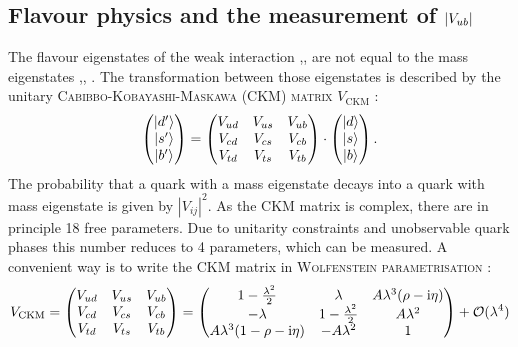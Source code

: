 \subsection{Flavour physics and the measurement of $|{V_{{u}{b}}}|$}
The flavour eigenstates of the weak interaction ,,  are not equal to the mass eigenstates \ket{\dquark},\ket{\squark},  \ket{\bquark}.
The transformation between those eigenstates is described by the unitary \textsc{Cabibbo-Kobayashi-Maskawa (CKM) matrix} $V_\text{CKM}$ \cite{Kobayashi_CKM}:
\begin{align}
\begin{pmatrix}
|d'\rangle \\ |s'\rangle \\ |b'\rangle
\end{pmatrix}
=
\begin{pmatrix}
V_{ud} & V_{us} & V_{ub} \\
V_{cd} & V_{cs} & V_{cb} \\
V_{td} & V_{ts} & V_{tb} \\
\end{pmatrix}
\cdot
\begin{pmatrix}
|d\rangle \\ |s\rangle \\ |b\rangle
\end{pmatrix}.
\end{align}
The probability that a quark with a mass eigenstate  decays into a quark with mass eigenstate  is given by $|V_{ij}|^2$.
As the CKM matrix is complex, there are in principle 18 free parameters.
Due to unitarity constraints and unobservable quark phases this number reduces to 4 parameters, which can be measured.
A convenient way is to write the CKM matrix in \textsc{Wolfenstein parametrisation} \cite{Wolfenstein}:
\begin{align}
    V_{\text{CKM}}=
    \begin{pmatrix}
    V_{ud} & V_{us} & V_{ub} \\
    V_{cd} & V_{cs} & V_{cb} \\
    V_{td} & V_{ts} & V_{tb} \\
    \end{pmatrix}
    =
    \begin{pmatrix}
    1-\frac{\lambda^2}{2} & \lambda & A\lambda^3(\rho-\mathrm{i}\eta) \\
    -\lambda & 1-\frac{\lambda^2}{2} & A\lambda^2 \\
    A\lambda^3(1-\rho-\mathrm{i}\eta) & -A\lambda^2 & 1
    \end{pmatrix}
    + \mathcal{O}(\lambda^4)
\end{align}
